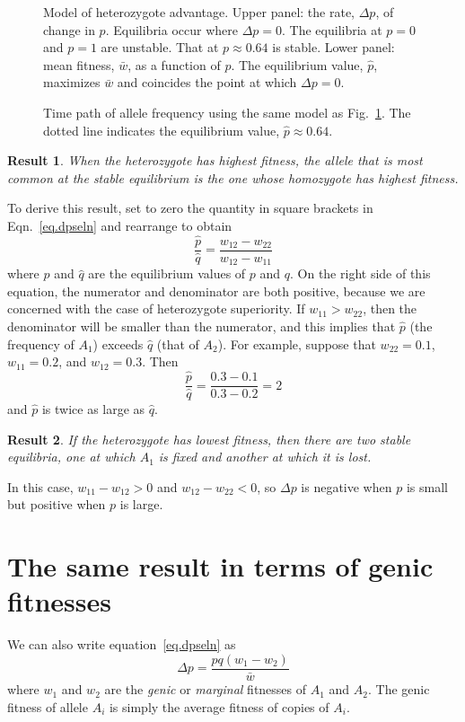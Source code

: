 \documentclass[11pt]{article}
\newtheorem{result}{Result}
\begin{document}
\begin{figure}
\centering 
\caption{Model of heterozygote advantage. Upper panel: the rate,
  $\Delta p$, of change in $p$. Equilibria occur where $\Delta
  p=0$. The equilibria at $p=0$ and $p=1$ are unstable. That at $p
  \approx 0.64$ is stable. Lower panel: mean fitness, $\bar w$, as a
  function of $p$. The equilibrium value, $\hat p$, maximizes $\bar w$
  and coincides the point at which $\Delta p = 0$.  }
\label{fig.dpseln}
\end{figure}

\begin{figure}

\caption{Time path of allele frequency using the same model as
  Fig.~\ref{fig.dpseln}. The dotted line indicates the equilibrium
  value, $\hat p \approx 0.64$.}
\label{fig.timepath}
\end{figure}

\begin{result}
  When the heterozygote has highest fitness, the allele that is most
  common at the stable equilibrium is the one whose homozygote has
  highest fitness.
\end{result}
To derive this result, set to zero the quantity in square brackets in
Eqn.~\ref{eq.dpseln} and rearrange to obtain
\[
\frac{\hat p}{\hat q} = \frac{w_{12} - w_{22}}{w_{12} - w_{11}}
\]
where $\hat p$ and $\hat q$ are the equilibrium values of $p$ and $q$.
On the right side of this equation, the numerator and denominator are
both positive, because we are concerned with the case of heterozygote
superiority. If $w_{11} > w_{22}$, then the denominator will be
smaller than the numerator, and this implies that $\hat p$ (the frequency
of $A_1$) exceeds $\hat q$ (that of $A_2$). For example, suppose that
$w_{22}=0.1$, $w_{11}=0.2$, and $w_{12}=0.3$. Then
\[
\frac{\hat p}{\hat q} = \frac{0.3 - 0.1}{0.3 - 0.2} = 2
\]
and $\hat p$ is twice as large as $\hat q$.

\begin{result}
If the heterozygote has lowest fitness, then there are two stable
equilibria, one at which $A_1$ is fixed and another at which it is
lost.
\end{result}
In this case, $w_{11} - w_{12} > 0$ and $w_{12} - w_{22} < 0$, so
$\Delta p$ is negative when $p$ is small but positive when $p$ is
large.

\section{The same result in terms of genic fitnesses}
\label{sec.genicfitness}
We can also write equation~\ref{eq.dpseln} as
\begin{equation}
\Delta p = \frac{p q(w_1 - w_2)}{\bar w}
\label{eq.dpseln.genic}
\end{equation}
where $w_1$ and $w_2$ are the \emph{genic} or \emph{marginal}
fitnesses of $A_1$ and $A_2$.  The genic fitness of allele $A_i$ is
simply the average fitness of copies of $A_i$.
\end{document}
